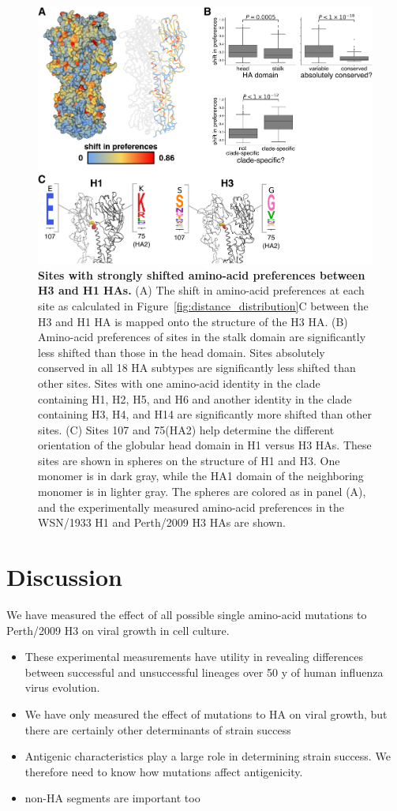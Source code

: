 \documentclass[9pt,twocolumn,twoside]{pnas-new}
\begin{document}
\begin{figure}
\centering
\includegraphics[width=11.4cm]{figs/RMSD_heatmap/RMSD_heatmap.pdf}
\caption{\label{fig:RMSD_heatmap}
{\bf Sites with strongly shifted amino-acid preferences between H3 and H1 HAs.}
(A) The shift in amino-acid preferences at each site as calculated in Figure~\ref{fig:distance_distribution}C between the H3 and H1 HA is mapped onto the structure of the H3 HA. 
(B) Amino-acid preferences of sites in the stalk domain are significantly less shifted than those in the head domain.
Sites absolutely conserved in all 18 HA subtypes are significantly less shifted than other sites.
Sites with one amino-acid identity in the clade containing H1, H2, H5, and H6 and another identity in the clade containing H3, H4, and H14 are significantly more shifted than other sites.
(C) Sites 107 and 75(HA2) help determine the different orientation of the globular head domain in H1 versus H3 HAs.
These sites are shown in spheres on the structure of H1 and H3. 
One monomer is in dark gray, while the HA1 domain of the neighboring monomer is in lighter gray.
The spheres are colored as in panel (A), and the experimentally measured amino-acid preferences in the WSN/1933 H1 and Perth/2009 H3 HAs are shown.
}
\end{figure}

\section*{Discussion}
\label{sec:discussion}
We have measured the effect of all possible single amino-acid mutations to Perth/2009 H3 on viral growth in cell culture.

\begin{itemize}
\item{These experimental measurements have utility in revealing differences between successful and unsuccessful lineages over 50 y of human influenza virus evolution.}
\item{We have only measured the effect of mutations to HA on viral growth, but there are certainly other determinants of strain success}
\item{Antigenic characteristics play a large role in determining strain success. We therefore need to know how mutations affect antigenicity.}
\item{non-HA segments are important too}
\end{itemize}
\end{document}
